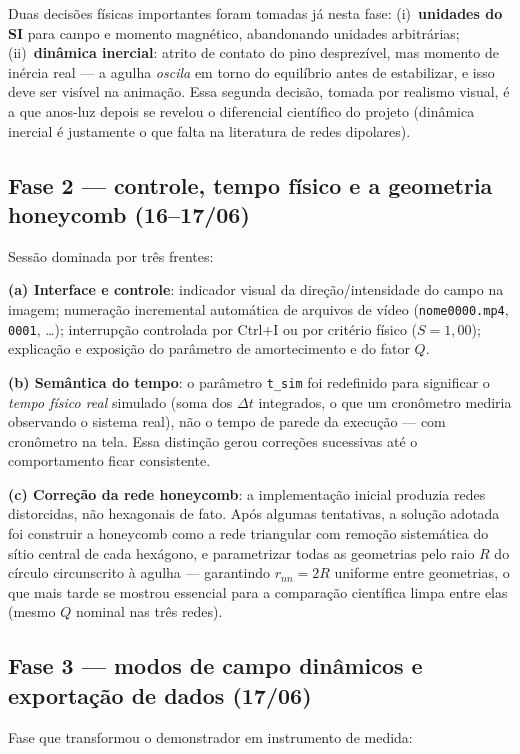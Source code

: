\documentclass[11pt,a4paper]{article}
\newcommand{\code}[1]{\texttt{#1}}
\begin{document}
Duas decisões físicas importantes foram tomadas já nesta fase:
(i)~\textbf{unidades do SI} para campo e momento magnético, abandonando
unidades arbitrárias; (ii)~\textbf{dinâmica inercial}: atrito de contato
do pino desprezível, mas momento de inércia real --- a agulha
\emph{oscila} em torno do equilíbrio antes de estabilizar, e isso deve
ser visível na animação. Essa segunda decisão, tomada por realismo
visual, é a que anos-luz depois se revelou o diferencial científico do
projeto (dinâmica inercial é justamente o que falta na literatura de
redes dipolares).

\subsection{Fase 2 --- controle, tempo físico e a geometria honeycomb
(16--17/06)}

Sessão dominada por três frentes:

\textbf{(a) Interface e controle}: indicador visual da direção/intensidade
do campo na imagem; numeração incremental automática de arquivos de
vídeo (\code{nome0000.mp4}, \code{0001}, \dots); interrupção controlada
por \mbox{Ctrl+I} ou por critério físico ($S = 1{,}00$); explicação e
exposição do parâmetro de amortecimento e do fator $Q$.

\textbf{(b) Semântica do tempo}: o parâmetro \code{t\_sim} foi
redefinido para significar o \emph{tempo físico real} simulado (soma dos
$\Delta t$ integrados, o que um cronômetro mediria observando o sistema
real), não o tempo de parede da execução --- com cronômetro na tela.
Essa distinção gerou correções sucessivas até o comportamento ficar
consistente.

\textbf{(c) Correção da rede honeycomb}: a implementação inicial
produzia redes distorcidas, não hexagonais de fato. Após algumas
tentativas, a solução adotada foi construir a honeycomb como a rede
triangular com remoção sistemática do sítio central de cada hexágono, e
parametrizar todas as geometrias pelo raio $R$ do círculo circunscrito à
agulha --- garantindo $r_{nn} = 2R$ uniforme entre geometrias, o que
mais tarde se mostrou essencial para a comparação científica limpa entre
elas (mesmo $Q$ nominal nas três redes).

\subsection{Fase 3 --- modos de campo dinâmicos e exportação de dados
(17/06)}

Fase que transformou o demonstrador em instrumento de medida:
\end{document}
